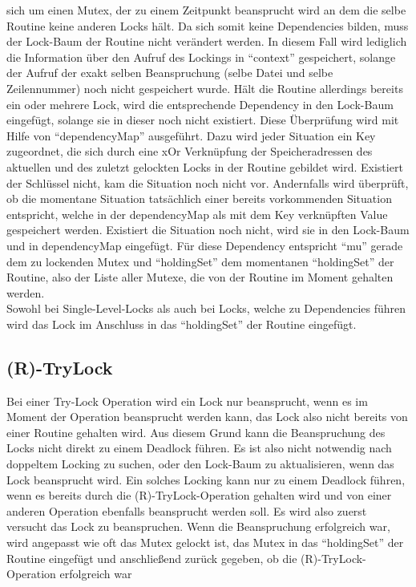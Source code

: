 sich um einen Mutex, der zu einem Zeitpunkt beansprucht wird an dem die 
selbe Routine keine anderen Locks hält. Da sich somit keine Dependencies bilden,
muss der Lock-Baum der Routine nicht verändert werden. In diesem Fall wird 
lediglich die Information über den Aufruf des Lockings in ``context'' gespeichert,
solange der Aufruf der exakt selben Beanspruchung (selbe Datei und selbe Zeilennummer)
noch nicht gespeichert wurde. Hält die Routine allerdings bereits ein oder 
mehrere Lock, wird die entsprechende Dependency in den Lock-Baum eingefügt,
solange sie in dieser noch nicht existiert. Diese Überprüfung wird mit Hilfe 
von ``dependencyMap'' ausgeführt. Dazu wird jeder Situation ein 
Key zugeordnet, die sich durch eine xOr Verknüpfung der Speicheradressen
des aktuellen und des zuletzt gelockten Locks in der Routine gebildet wird.
Existiert der Schlüssel nicht, kam die Situation noch nicht vor. Andernfalls 
wird überprüft, ob die momentane Situation tatsächlich einer bereits vorkommenden 
Situation entspricht, welche in der dependencyMap als mit dem Key verknüpften Value 
gespeichert werden.
Existiert die Situation noch nicht, wird sie in den 
Lock-Baum und in dependencyMap eingefügt. Für diese Dependency entspricht ``mu''
gerade dem zu lockenden Mutex und ``holdingSet'' dem momentanen ``holdingSet'' 
der Routine, also der Liste aller Mutexe, die von der Routine im Moment gehalten 
werden.\\
Sowohl bei Single-Level-Locks als auch bei Locks, welche zu Dependencies führen
wird das Lock im Anschluss in das ``holdingSet'' der Routine eingefügt.
\subsection{(R)-TryLock}
Bei einer Try-Lock Operation wird ein Lock nur beansprucht, wenn es im Moment 
der Operation beansprucht werden kann, das Lock also nicht bereits von einer Routine 
gehalten wird. Aus diesem Grund kann die Beanspruchung des Locks nicht direkt 
zu einem Deadlock führen. Es ist also nicht notwendig nach doppeltem Locking 
zu suchen, oder den Lock-Baum zu aktualisieren, wenn das Lock beansprucht wird.
Ein solches Locking kann nur zu einem Deadlock führen, wenn es bereits durch 
die (R)-TryLock-Operation gehalten wird und von einer anderen Operation ebenfalls 
beansprucht werden soll. Es wird also zuerst versucht das Lock zu beanspruchen.
Wenn die Beanspruchung erfolgreich war, wird angepasst wie oft das Mutex gelockt ist,
das Mutex in das ``holdingSet'' der Routine eingefügt und anschließend zurück 
gegeben, ob die (R)-TryLock-Operation erfolgreich war
